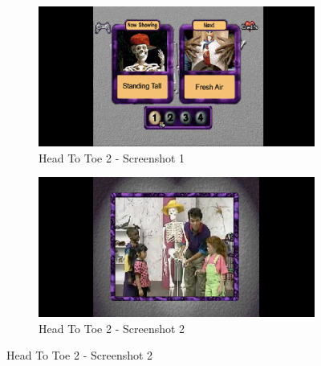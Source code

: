 \begin{figure}[H]
    \centering
    \begin{subfigure}{0.45\textwidth}
        \centering
        \includegraphics[width=\linewidth]{Games/HeadtoToe/Images/HeadToToe2Image1.png}
        \caption{Head To Toe 2 - Screenshot 1}
    \end{subfigure}
    \begin{subfigure}{0.45\textwidth}
        \includegraphics[width=\linewidth]{Games/HeadtoToe/Images/HeadToToe2Image2.png}
        \caption{Head To Toe 2 - Screenshot 2}
    \end{subfigure}


\end{figure}
